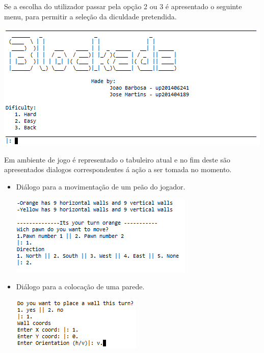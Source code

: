 \documentclass[a4paper]{article}
\begin{document}
Se a escolha do utilizador passar pela opção 2 ou 3 é apresentado o seguinte menu, para permitir a seleção da diculdade pretendida.

\begin{center}
	\includegraphics[scale = 0.7]{fig6.png}
\end{center}

Em ambiente de jogo é representado o tabuleiro atual e no fim deste são apresentados dialogos correspondentes á ação a ser tomada no momento.

  \begin{itemize}
		\item Diálogo para a movimentação de um peão do jogador.	
		\begin{center}
			\includegraphics[scale = 0.7]{fig7.png}
		\end{center}
		\item Diálogo para a colocação de uma parede.
		\begin{center}
			\includegraphics[scale = 0.7]{fig8.png}
		\end{center}
	\end{itemize}






\end{document}
